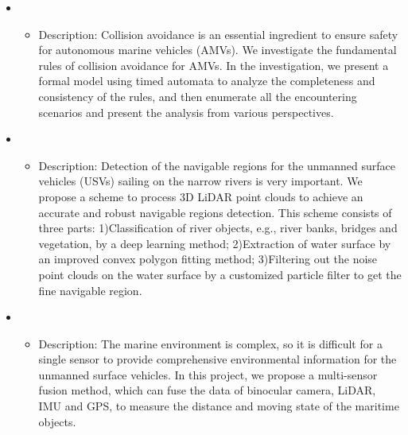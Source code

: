 ﻿
  \begin{itemize}[leftmargin=*]

    \item {}
    {\small
     \begin{itemize}
         \item{Description: Collision avoidance is an essential ingredient to ensure safety for autonomous marine vehicles (AMVs). We investigate the fundamental rules of collision avoidance for AMVs. In the investigation, we present a formal model using timed automata to analyze the completeness and consistency of the rules, and then enumerate all the encountering scenarios and present the analysis from various perspectives.}
     \end{itemize}
    }

    \item {}
    {\small
     \begin{itemize}
         \item{Description: Detection of the navigable regions for the unmanned surface vehicles (USVs) sailing on the narrow rivers is very important. We propose a scheme to process 3D LiDAR point clouds to achieve an accurate and robust navigable regions detection. This scheme consists of three parts: 1)Classification of river objects, e.g., river banks, bridges and vegetation, by a deep learning method; 2)Extraction of water surface by an improved convex polygon fitting method; 3)Filtering out the noise point clouds on the water surface by a customized particle filter to get the fine navigable region.}
     \end{itemize}
    }

    \item {}
    {\small
     \begin{itemize}
         \item{Description: The marine environment is complex, so it is difficult for a single sensor to provide comprehensive environmental information for the unmanned surface vehicles. In this project, we propose a multi-sensor fusion method, which can fuse the data of binocular camera, LiDAR, IMU and GPS, to measure the distance and moving state of the maritime objects.}
     \end{itemize}
    }


\end{itemize}
